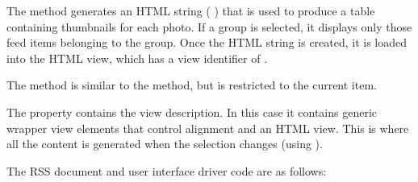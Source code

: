 \documentclass[letterpaper,12pt,english,openany,oneside]{sphinxmanual}
\begin{document}
The  method generates an HTML string ( ) that is used to produce a table containing thumbnails for each photo. If a group is selected, it displays only those feed items belonging to the group. Once the HTML string is created, it is loaded into the HTML view, which has a view identifier of  .

\begin{sphinxVerbatim}[commandchars=\\\{\}]
   
  
\end{sphinxVerbatim}

The  method is similar to the  method, but is restricted to the current item.

The  property contains the view description. In this case it contains generic wrapper view elements that control alignment and an HTML view. This is where all the content is generated when the selection changes (using  ).

The RSS document and user interface driver code are as follows:
\end{document}
